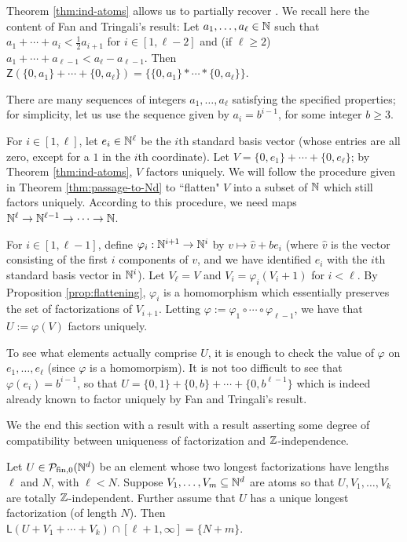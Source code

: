 \begin{eg} \label{eg:recover-flat-unique-fac}
Theorem \ref{thm:ind-atoms} allows us to partially recover \cite[Proposition 4.9]{fan-tringali18}.
We recall here the content of Fan and Tringali's result: Let $a_1,\dots, a_\ell \in \mathbb{N}$ such that $a_1 + \cdots + a_i < \frac{1}{2} a_{i+1}$ for $i\in [ 1,\ell-2 ]$ and (if $\ell \ge 2$) $a_1+\cdots + a_{\ell-1} < a_\ell - a_{\ell-1}$.
Then $\mathsf{Z}(\{0,a_1\}+\cdots+\{0,a_\ell\}) = \{ \{0,a_1\}*\cdots*\{0,a_\ell\}\}$.

There are many sequences of integers $a_1,\dots,a_\ell$ satisfying the specified properties; for simplicity, let us use the sequence given by $a_i = b^{i-1}$, for some integer $b \ge 3$.

For $i\in [ 1,\ell ]$, let $e_i \in \mathbb{N}^\ell$ be the $i$th standard basis vector (whose entries are all zero, except for a $1$ in the $i$th coordinate).
Let $V = \{0,e_1\} + \cdots + \{0,e_\ell\}$; by Theorem \ref{thm:ind-atoms}, $V$ factors uniquely.
We will follow the procedure given in Theorem \ref{thm:passage-to-Nd} to ``flatten" $V$ into a subset of $\mathbb{N}$ which still factors uniquely.
According to this procedure, we need maps $\mathbb{N}^\ell \to \mathbb{N}^{\ell-1} \to \dots \to \mathbb{N}$.

For $i\in [ 1,\ell-1 ]$, define $\varphi_i: \mathbb{N}^{i+1} \to \mathbb{N}^{i}$ by $v \mapsto \hat{v} + be_{i}$ (where $\hat{v}$ is the vector consisting of the first $i$ components of $v$, and we have identified $e_i$ with the $i$th standard basis vector in $\mathbb{N}^i$).
Let $V_\ell = V$ and $V_i = \varphi_i(V_i+1)$ for $i <\ell$.
By Proposition \ref{prop:flattening}, $\varphi_i$ is a homomorphism which essentially preserves the set of factorizations of $V_{i+1}$.
Letting $\varphi := \varphi_1\circ \cdots \circ \varphi_{\ell-1}$, we have that $U := \varphi(V)$ factors uniquely.

To see what elements actually comprise $U$, it is enough to check the value of $\varphi$ on $e_1,\dots, e_\ell$ (since $\varphi$ is a homomorpism).
It is not too difficult to see that $\varphi(e_i) = b^{i-1}$, so that $U = \{0,1\}+\{0,b\}+\cdots+\{0,b^{\ell-1}\}$ which is indeed already known to factor uniquely by Fan and Tringali's result.
\end{eg}

We the end this section with a result with a result asserting some degree of compatibility between uniqueness of factorization and $\mathbb{Z}$-independence.

\begin{thm} \label{thm:unique longest factorization}
Let $U\in \mathcal{P}_{\textrm{fin}, 0}(\mathbb{N}^d)$ be an element whose two longest factorizations have lengths $\ell$ and $N$, with $\ell < N$.
Suppose $V_1,\dots,V_m\subseteq \mathbb{N}^d$ are atoms so that $U,V_1,\dots, V_k$ are totally $\mathbb{Z}$-independent.
Further assume that $U$ has a unique longest factorization (of length $N$).
Then $\mathsf{L}(U+V_1+\cdots+V_k) \cap [ \ell+1,\infty ] = \{N+m\}$.
\end{thm}

